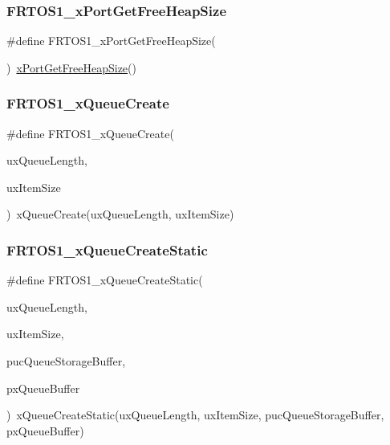 \subsubsection{\texorpdfstring{F\+R\+T\+O\+S1\+\_\+x\+Port\+Get\+Free\+Heap\+Size}{FRTOS1\_xPortGetFreeHeapSize}}
{\footnotesize\ttfamily \#define F\+R\+T\+O\+S1\+\_\+x\+Port\+Get\+Free\+Heap\+Size(\begin{DoxyParamCaption}{ }\end{DoxyParamCaption})~\hyperlink{portable_8h_a8f72fbee5c25c956bda528299ce6dd02}{x\+Port\+Get\+Free\+Heap\+Size}()}

\mbox{\label{group___f_r_t_o_s1__module_gac8252acb1e18de782bb342837c8c8494}} 
\subsubsection{\texorpdfstring{F\+R\+T\+O\+S1\+\_\+x\+Queue\+Create}{FRTOS1\_xQueueCreate}}
{\footnotesize\ttfamily \#define F\+R\+T\+O\+S1\+\_\+x\+Queue\+Create(\begin{DoxyParamCaption}\item[{}]{ux\+Queue\+Length,  }\item[{}]{ux\+Item\+Size }\end{DoxyParamCaption})~x\+Queue\+Create(ux\+Queue\+Length, ux\+Item\+Size)}

\mbox{\label{group___f_r_t_o_s1__module_ga5e5ab53690f521cdd9cfd798a4f65bc3}} 
\subsubsection{\texorpdfstring{F\+R\+T\+O\+S1\+\_\+x\+Queue\+Create\+Static}{FRTOS1\_xQueueCreateStatic}}
{\footnotesize\ttfamily \#define F\+R\+T\+O\+S1\+\_\+x\+Queue\+Create\+Static(\begin{DoxyParamCaption}\item[{}]{ux\+Queue\+Length,  }\item[{}]{ux\+Item\+Size,  }\item[{}]{puc\+Queue\+Storage\+Buffer,  }\item[{}]{px\+Queue\+Buffer }\end{DoxyParamCaption})~x\+Queue\+Create\+Static(ux\+Queue\+Length, ux\+Item\+Size, puc\+Queue\+Storage\+Buffer, px\+Queue\+Buffer)}

